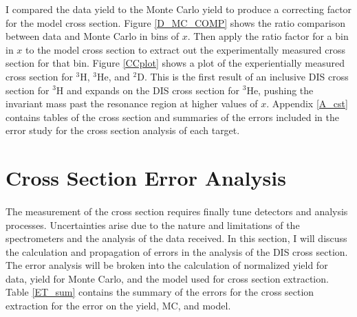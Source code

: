\iffalse
\begin{landscape}
\begin{figure}
	\hspace{-40pt}
	\texttt{[image: ../images/total\_xs\_L.pdf]}
	\caption{Experimentally measured cross section using the Monte Carlo ratio method for $^3$H, $^3$He, and $^2$D. Normalization uncertainty due to target thickness uncertainty for $^3$H= 0.97\%, $^3$He = 1.12\%, and $^2$D = 0.56\%.}
	\label{CCplot}
\end{figure}
\end{landscape}
\fi


I compared the data yield to the Monte Carlo yield to produce a correcting factor for the model cross section. Figure \ref{D_MC_COMP} shows the ratio comparison between data and Monte Carlo in bins of $x$. Then apply the ratio factor for a bin in $x$ to the model cross section to extract out the experimentally measured cross section for that bin. Figure \ref{CCplot} shows a plot of the experientially measured cross section for $^3$H, $^3$He, and $^2$D.  This is the first result of an inclusive DIS cross section for $^3$H and expands on the DIS cross section for $^3$He, pushing the invariant mass past the resonance region at higher values of $x$.  Appendix \ref{A_cst} contains tables of the cross section and summaries of the errors included in the error study for the cross section analysis of each target. 
\section{Cross Section Error Analysis}
\paragraph{}The measurement of the cross section requires finally tune detectors and analysis processes. Uncertainties arise due to the nature and limitations of the spectrometers and the analysis of the data received. In this section, I will discuss the calculation and propagation of errors in the analysis of the DIS cross section. The error analysis will be broken into the calculation of normalized yield for data, yield for Monte Carlo, and the model used for cross section extraction. Table \ref{ET_sum} contains the summary of the errors for the cross section extraction for the error on the yield, MC, and model. 

